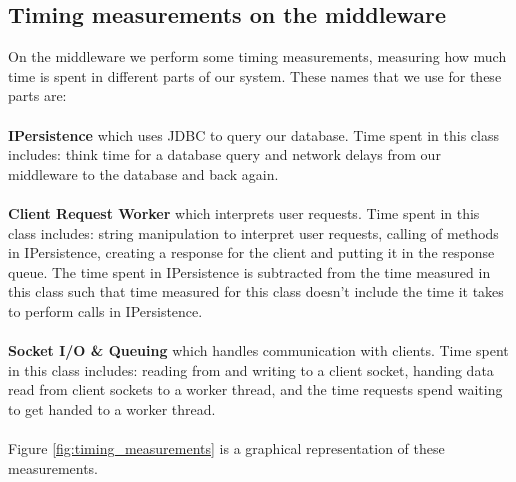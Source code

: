 \documentclass{article}
\begin{document}
        \subsection{Timing measurements on the middleware}
            On the middleware we perform some timing measurements, measuring how much time is spent in different parts of our system. These names that we use for these parts are:\\
            \\
            \indent \textbf{IPersistence} which uses JDBC to query our database. Time spent in this class includes: think time for a database query and network delays from our middleware to the database and back again.\\
            \\
            \indent \textbf{Client Request Worker} which interprets user requests. Time spent in this class includes: string manipulation to interpret user requests, calling of methods in IPersistence, creating a response for the client and putting it in the response queue. The time spent in IPersistence is subtracted from the time measured in this class such that time measured for this class doesn't include the time it takes to perform calls in IPersistence.\\
            \\
            \indent \textbf{Socket I/O \& Queuing} which handles communication with clients. Time spent in this class includes: reading from and writing to a client socket, handing data read from client sockets to a worker thread, and the time requests spend waiting to get handed to a worker thread.
            \\
            \\
            Figure \ref{fig:timing_measurements} is a graphical representation of these measurements.\\
\end{document}
